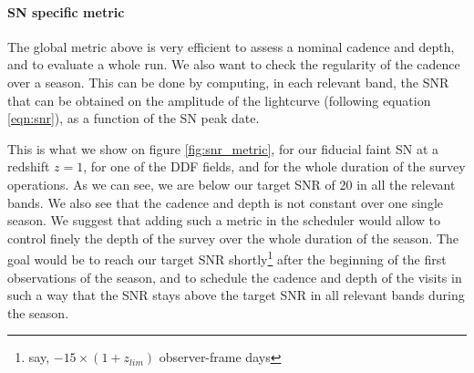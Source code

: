 \documentclass[\docopts]{\docclass}
\begin{document}
\paragraph{SN specific metric} The global metric above is very
efficient to assess a nominal cadence and depth, and to evaluate a
whole  run. We also want to check the regularity of the cadence
over a season. This can be done by computing, in each relevant band,
the SNR that can be obtained on the amplitude of the lightcurve
(following equation \ref{eqn:snr}), as a function of the SN peak date.

This is what we show  on figure \ref{fig:snr_metric}, for our fiducial
faint SN at a  redshift $z=1$, for one of the DDF  fields, and for the
whole duration of  the survey operations. As we can  see, we are below
our target SNR of  20 in all the relevant bands. We  also see that the
cadence and depth  is not constant over one single  season. We suggest
that adding  such a  metric in  the scheduler  would allow  to control
finely the depth of the survey  over the whole duration of the season.
The goal would  be to reach our target  SNR shortly\footnote{say, $-15
  \times (1  + z_{lim})$ observer-frame  days} after the  beginning of
the first observations of the season,  and to schedule the cadence and
depth of the visits in such a  way that the SNR stays above the target
SNR in all relevant bands during the season.




\end{document}
